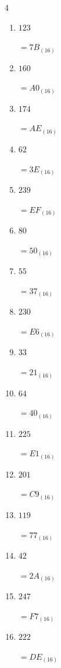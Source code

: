 \begin{multicols}{4}
\begin{enumerate}
  \item $123$

        $=7B_{(16)}$

\columnbreak %

  \item $160$

        $=A0_{(16)}$

  \item $174$

        $=AE_{(16)}$

  \item $62$

        $=3E_{(16)}$

  \item $239$

        $=EF_{(16)}$

  \item $80$

        $=50_{(16)}$

  \item $55$

        $=37_{(16)}$

  \item $230$

        $=E6_{(16)}$

  \item $33$

        $=21_{(16)}$

  \item $64$

        $=40_{(16)}$

  \item $225$

        $=E1_{(16)}$

  \item $201$

        $=C9_{(16)}$

  \item $119$

        $=77_{(16)}$

  \item $42$

        $=2A_{(16)}$

  \item $247$

        $=F7_{(16)}$

  \item $222$

        $=DE_{(16)}$

\columnbreak %


\end{enumerate}
\end{multicols}
